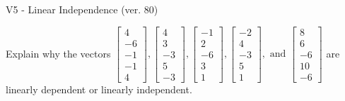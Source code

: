 \begin{exercise}
  \begin{exerciseTitle}V5 - Linear Independence (ver. 80)\end{exerciseTitle}
  \begin{exerciseStatement}
    Explain why the vectors \(\left[\begin{array}{r}
4 \\
-6 \\
-1 \\
-1 \\
4
\end{array}\right] , \left[\begin{array}{r}
4 \\
3 \\
-3 \\
5 \\
-3
\end{array}\right] , \left[\begin{array}{r}
-1 \\
2 \\
-6 \\
3 \\
1
\end{array}\right] , \left[\begin{array}{r}
-2 \\
4 \\
-3 \\
5 \\
1
\end{array}\right] , \text{ and } \left[\begin{array}{r}
8 \\
6 \\
-6 \\
10 \\
-6
\end{array}\right]\) are linearly dependent or linearly independent.	



\end{exerciseStatement}
\end{exercise}
